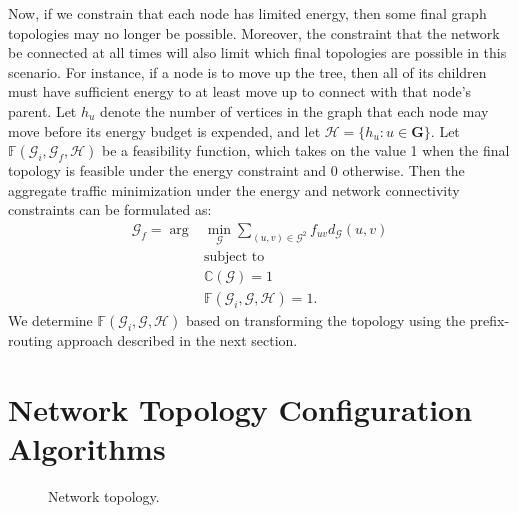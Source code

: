 \documentclass[10pt,conference]{IEEEtran}
\begin{document}
Now, if we constrain that each node has limited energy, then some
final graph topologies may no longer be possible.  Moreover, the
constraint that the network be connected at all times will also limit
which final topologies are possible in this scenario.  For instance,
if a node is to move up the tree, then all of its children must have
sufficient energy to at least move up to connect with that node's
parent.  Let $h_u$ denote the number of vertices in the graph that
each node may move before its energy budget is expended, and let
$\mathcal{H}= \{ h_u : u \in \mathbf{G} \}$. Let
$\mathbb{F}(\mathcal{G}_{i},\mathcal{G}_{f},\mathcal{H})$ be a
feasibility function, which takes on the value 1 when the final
topology is feasible under the energy constraint and 0 otherwise.
Then the aggregate traffic minimization under the energy and network
connectivity constraints can be formulated as:
\begin{align}
\label{eq:min_energy_constraint} \mathcal{G}_f = \arg & \min_{\mathcal{G}}
\sum_{(u,v) \in \mathcal{G}^2} f_{uv} d_{\mathcal{G}}(u,v)\\
& \mbox{subject to} \nonumber \\
& \mathbb{C}(\mathcal{G})=1 \nonumber \\
& \mathbb{F}(\mathcal{G}_{i},\mathcal{G},\mathcal{H})=1. \nonumber
\end{align}
We determine $ \mathbb{F}(\mathcal{G}_i,\mathcal{G},\mathcal{H})$
based on transforming the topology using the prefix-routing approach
described in the next section.





\section{Network Topology Configuration Algorithms}
\label{sec:network}
\begin{figure}[t]
\centering
{}
\caption{Network topology.}
\label{fig:network_1}
\end{figure}
\end{document}

